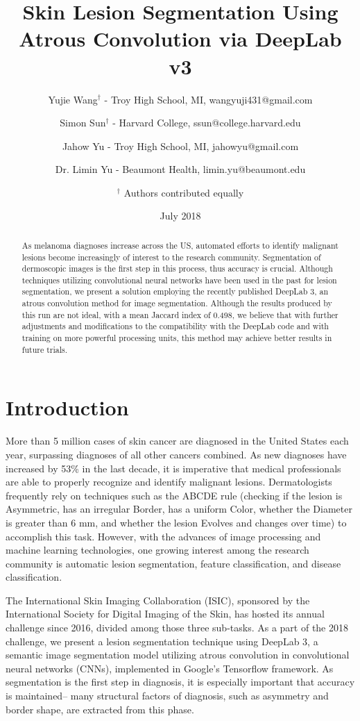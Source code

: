 \documentclass[11pt, letterpaper]{article}
\title{Skin Lesion Segmentation Using Atrous Convolution via DeepLab v3}
\author{Yujie Wang$^{\dag}$ - Troy High School, MI, wangyuji431@gmail.com \and Simon Sun$^{\dag}$ - Harvard College, ssun@college.harvard.edu \and Jahow Yu - Troy High School, MI, jahowyu@gmail.com \and Dr. Limin Yu - Beaumont Health, limin.yu@beaumont.edu \and $^{\dag}$ Authors contributed equally}
\date{July 2018}
\begin{document}
 
\maketitle
 
\begin{abstract}
	As melanoma diagnoses increase across the US, automated efforts to identify malignant lesions become increasingly of interest to the research community. Segmentation of dermoscopic images is the first step in this process, thus accuracy is crucial. Although techniques utilizing convolutional neural networks have been used in the past for lesion segmentation, we present a solution employing the recently published DeepLab 3, an atrous convolution method for image segmentation. Although the results produced by this run are not ideal, with a mean Jaccard index of 0.498, we believe that with further adjustments and modifications to the compatibility with the DeepLab code and with training on more powerful processing units, this method may achieve better results in future trials.
\end{abstract}

\section{Introduction}
	More than 5 million cases of skin cancer are diagnosed in the United States each year, surpassing diagnoses of all other cancers combined. As new diagnoses have increased by 53\% in the last decade, it is imperative that medical professionals are able to properly recognize and identify malignant lesions. Dermatologists frequently rely on techniques such as the ABCDE rule (checking if the lesion is Asymmetric, has an irregular Border, has a uniform Color, whether the Diameter is greater than 6 mm, and whether the lesion Evolves and changes over time) to accomplish this task. However, with the advances of image processing and machine learning technologies, one growing interest among the research community is automatic lesion segmentation, feature classification, and disease classification. 
	
The International Skin Imaging Collaboration (ISIC), sponsored by the International Society for Digital Imaging of the Skin, has hosted its annual challenge since 2016, divided among those three sub-tasks. As a part of the 2018 challenge, we present a lesion segmentation technique using DeepLab 3, a semantic image segmentation model utilizing atrous convolution in convolutional neural networks (CNNs), implemented in Google’s Tensorflow framework. As segmentation is the first step in diagnosis, it is especially important that accuracy is maintained-- many structural factors of diagnosis, such as asymmetry and border shape, are extracted from this phase. 
\end{document}
